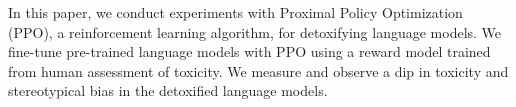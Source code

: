 In this paper, we conduct experiments with Proximal Policy Optimization (PPO), a reinforcement learning algorithm, for detoxifying language models. We fine-tune pre-trained language models with PPO using a reward model trained from human assessment of toxicity. We measure and observe a dip in toxicity and stereotypical bias in the detoxified language models.
